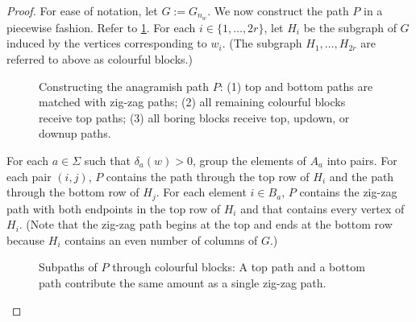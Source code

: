 \documentclass{patmorin}
\begin{document}
\begin{proof}
    For ease of notation, let $G:=G_{n_w}$.  We now construct the path $P$ in a piecewise fashion.  Refer to \cref{path_construction}.  For each $i\in\{1,\ldots,2r\}$, let $H_i$ be the subgraph of $G$ induced by the vertices corresponding to $w_i$. (The subgraph $H_1,\ldots,H_{2r}$ are referred to above as colourful blocks.)
    \begin{figure}
        \caption{Constructing the anagramish path $P$:
            (1) top and bottom paths are matched with zig-zag paths;
            (2) all remaining colourful blocks receive top paths;
            (3) all boring blocks receive top, updown, or downup paths.
        }
        \label{path_construction}
    \end{figure}
    \begin{compactenum}
        \item For each $a\in\Sigma$ such that $\delta_a(w)>0$, group the elements of $A_a$ into pairs.  For each pair $(i,j)$, $P$ contains the path through the top row of $H_i$ and the path through the bottom row of $H_j$.  For each element $i\in B_a$, $P$ contains the zig-zag path with both endpoints in the top row of $H_i$ and that contains every vertex of $H_i$.  (Note that the zig-zag path begins at the top and ends at the bottom row because $H_i$ contains an even number of columns of $G$.)

        \begin{figure}
            \caption{Subpaths of $P$ through colourful blocks: A top path and a bottom path contribute the same amount as a single zig-zag path.}
        \end{figure}



\end{compactenum}
\end{proof}
\end{document}
